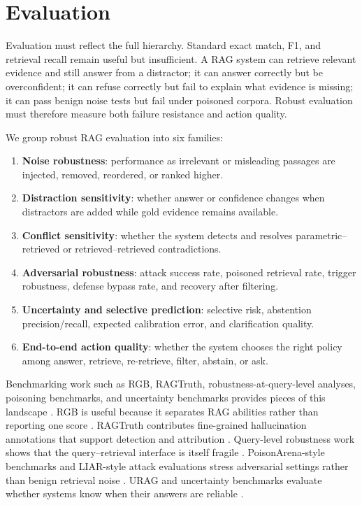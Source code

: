 \documentclass[11pt]{article}
\begin{document}
\section{Evaluation}
\label{sec:evaluation}








Evaluation must reflect the full hierarchy. Standard exact match, F1, and retrieval recall remain useful but insufficient. A RAG system can retrieve relevant evidence and still answer from a distractor; it can answer correctly but be overconfident; it can refuse correctly but fail to explain what evidence is missing; it can pass benign noise tests but fail under poisoned corpora. Robust evaluation must therefore measure both failure resistance and action quality.

We group robust RAG evaluation into six families:
\begin{enumerate}[leftmargin=*]
    \item \textbf{Noise robustness}: performance as irrelevant or misleading passages are injected, removed, reordered, or ranked higher.
    \item \textbf{Distraction sensitivity}: whether answer or confidence changes when distractors are added while gold evidence remains available.
    \item \textbf{Conflict sensitivity}: whether the system detects and resolves parametric--retrieved or retrieved--retrieved contradictions.
    \item \textbf{Adversarial robustness}: attack success rate, poisoned retrieval rate, trigger robustness, defense bypass rate, and recovery after filtering.
    \item \textbf{Uncertainty and selective prediction}: selective risk, abstention precision/recall, expected calibration error, and clarification quality.
    \item \textbf{End-to-end action quality}: whether the system chooses the right policy among answer, retrieve, re-retrieve, filter, abstain, or ask.
\end{enumerate}
Benchmarking work such as RGB, RAGTruth, robustness-at-query-level analyses, poisoning benchmarks, and uncertainty benchmarks provides pieces of this landscape \citep{rgb2023,ragTruth2024,queryRobustness2025}. RGB is useful because it separates RAG abilities rather than reporting one score \citep{rgb2023}. RAGTruth contributes fine-grained hallucination annotations that support detection and attribution \citep{ragTruth2024}. Query-level robustness work shows that the query--retrieval interface is itself fragile \citep{queryRobustness2025}. PoisonArena-style benchmarks and LIAR-style attack evaluations stress adversarial settings rather than benign retrieval noise \citep{rrag023,rrag035}. URAG and uncertainty benchmarks evaluate whether systems know when their answers are reliable \citep{rrag001,rrag093}.
\end{document}
